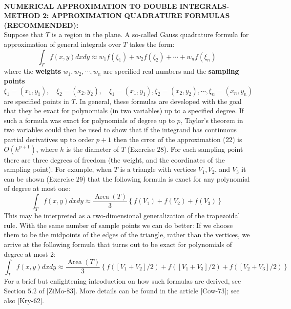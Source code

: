 \documentclass[../main.tex]{subfiles}
\begin{document}
\\
\textbf{NUMERICAL APPROXIMATION TO DOUBLE INTEGRALS-
METHOD 2: APPROXIMATION QUADRATURE FORMULAS 
(RECOMMENDED): }
\\
Suppose that $T$ is a region in the plane. A so-called Gauss quadrature formula for approximation of general integrals over $T$ takes the form:
\begin{equation}
\int_{T} f(x, y) d x d y \approx w_{1} f\left(\xi_{1}\right)+w_{2} f\left(\xi_{2}\right)+\cdots+w_{n} f\left(\xi_{n}\right)
\end{equation}
where the \textbf{weights} $w_{1}, w_{2}, \cdots, w_{n}$ are specified real numbers and the \textbf{sampling points} $\xi_{1}=\left(x_{1}, y_{1}\right), \quad \xi_{2}=\left(x_{2}, y_{2}\right), \quad \xi_{1}=\left(x_{1}, y_{1}\right), \xi_{2}=\left(x_{2}, y_{2}\right), \cdots, \xi_{n}=\left(x_{n}, y_{n}\right)$ are specified points in $T$. In general, these formulas are developed with the goal that they be exact for polynomials (in two variables) up to a specified degree. If such a formula was exact for polynomials of degree up to $p$, Taylor's theorem in two variables could then be used to show that if the integrand has continuous partial derivatives up to order $p+1$ then the crror of the approximation (22) is $O\left(h^{p+1}\right)$, where $h$ is the diameter of $T$ (Exercise 28). For each sampling point there are three degrees of freedom (the weight, and the coordinates of the sampling point). For example, when $T$ is a triangle with vertices $V_{1}, V_{2}$, and $V_{3}$ it can be shown (Exercise 29) that the following formula is exact for any polynomial of degree at most one:
\begin{equation}
\int_{T} f(x, y) d x d y \approx \frac{\operatorname{Area}(T)}{3}\left\{f\left(V_{1}\right)+f\left(V_{2}\right)+f\left(V_{3}\right)\right\}
\end{equation}
This may be interpreted as a two-dimensional generalization of the trapezoidal rule. With the same number of sample points we can do better: If we choose them to be the midpoints of the edges of the triangle, rather than the vertices, we arrive at the following formula that turns out to be exact for polynomials of degree at most 2:
\begin{equation}
\int_{T} f(x, y) d x d y \approx \frac{\operatorname{Area}(T)}{3}\left\{f\left(\left[V_{1}+V_{2}\right] / 2\right)+f\left(\left[V_{1}+V_{3}\right] / 2\right)+f\left(\left[V_{2}+V_{3}\right] / 2\right)\right\}
\end{equation}
For a brief but enlightening introduction on how such formulas are derived, see Section $5.2$ of [ZiMo-83]. More details can be found in the article [Cow-73]; see also [Kry-62].
\end{document}
